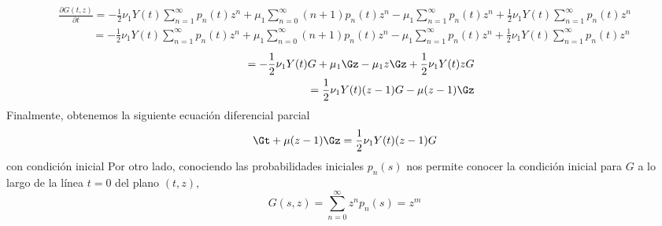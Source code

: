 \begin{eqnarray*}
   \frac{\partial G(t,z)}{\partial t} =-\frac{1}{2}\nu_1Y(t)\sum_{n=1}^\infty p_n(t)z^n +\mu_1\sum_{n=0}^\infty (n+1)p_n(t)z^n-\mu_1\sum_{n=1}^\infty p_n(t)z^n+\frac{1}{2}\nu_1Y(t)\sum_{n=1}^\infty p_n(t)z^n
\end{eqnarray*}
\begin{eqnarray*}
    \quad\quad\quad=-\frac{1}{2}\nu_1Y(t)\sum_{n=1}^\infty p_n(t)z^n+\mu_1\sum_{n=0}^\infty (n+1)p_n(t)z^n-\mu_1\sum_{n=1}^\infty p_n(t)z^n+\frac{1}{2}\nu_1Y(t)\sum_{n=1}^\infty p_n(t)z^n
\end{eqnarray*}
\begin{eqnarray*}
  \quad\quad\quad=-\frac{1}{2}\nu_1Y(t)G+\mu_1\Gz-\mu_1z\Gz+\frac{1}{2}\nu_1Y(t)z G\\=\frac{1}{2}\nu_1Y(t)(z-1)G-\mu(z-1)\Gz
\end{eqnarray*}
Finalmente, obtenemos la siguiente ecuación diferencial parcial
$$ \Gt+\mu(z-1)\Gz=\frac{1}{2}\nu_1Y(t)(z-1)G$$
con condición inicial
Por otro lado, conociendo las probabilidades iniciales $p_n(s)$ nos permite conocer la condición inicial para $G$ a lo largo de la línea $t = 0$ del plano $(t, z)$,
$$G(s,z)=\sum_{n=0}^\infty z^n p_n(s)=z^m$$
